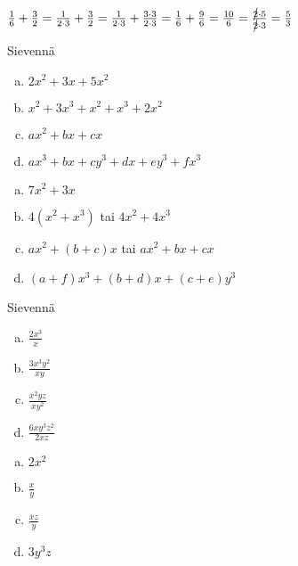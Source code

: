 
\begin{esimerkki}

$ \frac{1}{6} + \frac{3}{2} = \frac{1}{2\cdot 3} + \frac{3}{2} = \frac{1}{2 \cdot 3} + \frac{3 \cdot 3}{2 \cdot 3} = \frac{1}{6} + \frac{9}{6} = \frac{10}{6} = \frac{\cancel{2} \cdot 5}{\cancel{2} \cdot 3} = \frac{5}{3}$

\end{esimerkki}

\begin{tehtava}
Sievennä
	\begin{enumerate}[a)]
	\item $2x^2+3x+5x^2$
	\item $x^2+3x^3+x^2+x^3+2x^2$
	\item $ax^2+bx+cx$
	\item $ax^3+bx+cy^3+dx+ey^3+fx^3$
	\end{enumerate}

\begin{vastaus}
	\begin{enumerate}[a)]
	\item $7x^2+3x$
	\item $4(x^2+x^3)$ tai $4x^2+4x^3$
	\item $ax^2+(b+c)x$ tai $ax^2+bx+cx$
	\item $(a+f)x^3+(b+d)x+(c+e)y^3$
	\end{enumerate}
\end{vastaus}
\end{tehtava}

\begin{tehtava}
Sievennä
	\begin{enumerate}[a)]
	\item $\frac{2x^3}{x}$
	\item $\frac{3x^3y^2}{xy}$
	\item $\frac{x^2yz}{xy^2}$
	\item $\frac{6xy^3z^2}{2xz}$
	\end{enumerate}

\begin{vastaus}
	\begin{enumerate}[a)]
	\item $2x^2$
	\item $\frac{x}{y}$
	\item $\frac{xz}{y}$
	\item $3y^3z$
	\end{enumerate}
\end{vastaus}
\end{tehtava}

